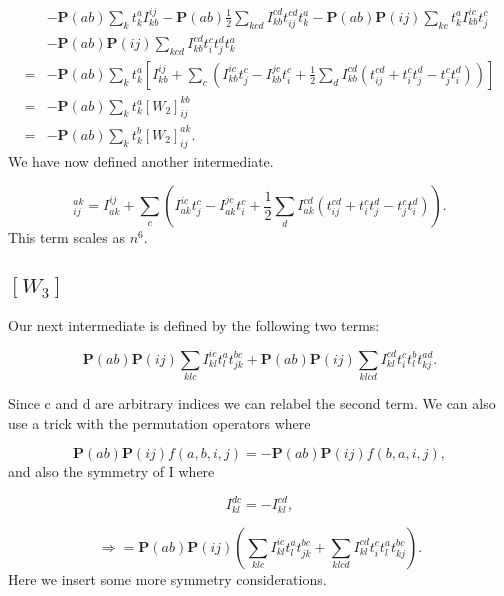 \begin{align}
& - \textbf{P}(ab) \sum_k t_k^a I_{kb}^{ij}
- \textbf{P}(ab) \frac{1}{2} \sum_{kcd} I_{kb}^{cd} t_{ij}^{cd} t_k^a
- \textbf{P}(ab) \textbf{P}(ij) \sum_{kc} t_k^a I_{kb}^{ic} t_j^c 
\nonumber \\
& - \textbf{P}(ab) \textbf{P}(ij) \sum_{kcd} I_{kb}^{cd} t_i^c t_j^d t_k^a
\nonumber \\
= &
- \textbf{P}(ab) \sum_k t_k^a \left[
I_{kb}^{ij} 
+ \sum_c \left( I_{kb}^{ic} t_j^c
- I_{kb}^{jc} t_i^c
+ \frac{1}{2} \sum_{d} I_{kb}^{cd} (t_{ij}^{cd}
+ t_i^c t_j^d - t_j^c t_i^d
) \right) \right]
\nonumber \\
= &
- \textbf{P}(ab) \sum_k t_k^a [W_2]_{ij}^{kb} \nonumber \\
= &
- \textbf{P}(ab) \sum_k t_k^b [W_2]_{ij}^{ak} .
\end{align}
We have now defined another intermediate.

\begin{equation}
[W_2]_{ij}^{ak} = I_{ak}^{ij} 
+ \sum_c \left( I_{ak}^{ic} t_j^c
- I_{ak}^{jc} t_i^c
+ \frac{1}{2} \sum_{d} I_{ak}^{cd} (t_{ij}^{cd}
+ t_i^c t_j^d - t_j^c t_i^d
) \right) . \label{intermedW2}
\end{equation}
This term scales as $n^6$.

\subsection{$[W_3]$}
Our next intermediate is defined by the following two terms:

\begin{equation}
\textbf{P}(ab) \textbf{P}(ij) \sum_{klc} I_{kl}^{ic} t_l^a t_{jk}^{bc}
+ \textbf{P}(ab) \textbf{P}(ij) \sum_{klcd} I_{kl}^{cd} t_i^c t_l^b t_{kj}^{ad} .
\end{equation}

Since c and d are arbitrary indices we can relabel the second term. We can also use a trick with the permutation operators where

\begin{equation}
\textbf{P}(ab) \textbf{P}(ij) f(a,b,i,j) = 
- \textbf{P}(ab) \textbf{P}(ij) f(b,a,i,j) ,
\end{equation}
and also the symmetry of I where

\begin{equation}
I_{kl}^{dc} = - I_{kl}^{cd} ,
\end{equation}

\begin{equation}
\Rightarrow =
\textbf{P}(ab) \textbf{P}(ij) \left(
\sum_{klc} I_{kl}^{ic} t_l^a t_{jk}^{bc}
+ \sum_{klcd} I_{kl}^{cd} t_i^c t_l^a t_{kj}^{bc}
\right) .
\end{equation}
Here we insert some more symmetry considerations.

